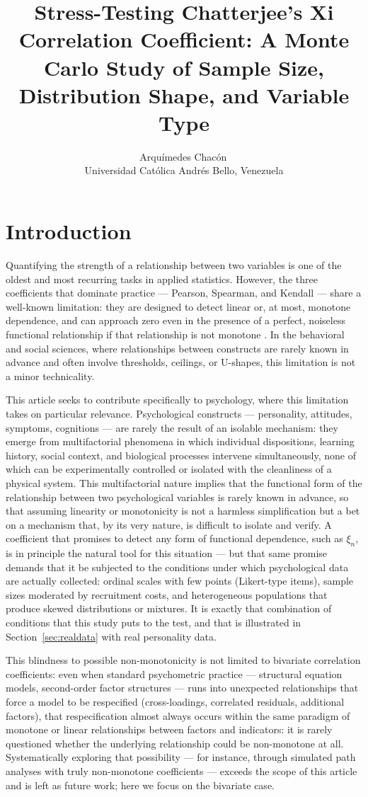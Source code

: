 \documentclass[article]{ajs}
\author{Arquímedes Chacón\,\orcidlink{0000-0002-7014-7513}\\ Universidad Católica Andrés Bello, Venezuela}
\title{Stress-Testing Chatterjee's Xi Correlation Coefficient: A Monte Carlo Study of Sample Size, Distribution Shape, and Variable Type}
\begin{document}
\section{Introduction} \label{sec:introduction}

Quantifying the strength of a relationship between two variables is
one of the oldest and most recurring tasks in applied statistics.
However, the three coefficients that dominate practice --- Pearson,
Spearman, and Kendall --- share a well-known limitation: they are
designed to detect linear or, at most, monotone dependence, and can
approach zero even in the presence of a perfect, noiseless functional
relationship if that relationship is not monotone \citep{chatterjee2021}.
In the behavioral and social sciences, where relationships between
constructs are rarely known in advance and often involve thresholds,
ceilings, or U-shapes, this limitation is not a minor technicality.

This article seeks to contribute specifically to psychology, where
this limitation takes on particular relevance. Psychological
constructs --- personality, attitudes, symptoms, cognitions --- are
rarely the result of an isolable mechanism: they emerge from
multifactorial phenomena in which individual dispositions, learning
history, social context, and biological processes intervene
simultaneously, none of which can be experimentally controlled or
isolated with the cleanliness of a physical system. This multifactorial
nature implies that the functional form of the relationship between
two psychological variables is rarely known in advance, so that
assuming linearity or monotonicity is not a harmless simplification but
a bet on a mechanism that, by its very nature, is difficult to isolate
and verify. A coefficient that promises to detect any form of
functional dependence, such as $\xi_n$, is in principle the natural
tool for this situation --- but that same promise demands that it be
subjected to the conditions under which psychological data are
actually collected: ordinal scales with few points (Likert-type items),
sample sizes moderated by recruitment costs, and heterogeneous
populations that produce skewed distributions or mixtures. It is
exactly that combination of conditions that this study puts to the
test, and that is illustrated in Section~\ref{sec:realdata} with real
personality data.

This blindness to possible non-monotonicity is not limited to
bivariate correlation coefficients: even when standard psychometric
practice --- structural equation models, second-order factor
structures --- runs into unexpected relationships that force a model
to be respecified (cross-loadings, correlated residuals, additional
factors), that respecification almost always occurs within the same
paradigm of monotone or linear relationships between factors and
indicators: it is rarely questioned whether the underlying relationship
could be non-monotone at all. Systematically exploring that
possibility --- for instance, through simulated path analyses with
truly non-monotone coefficients --- exceeds the scope of this article
and is left as future work; here we focus on the bivariate case.
\end{document}
